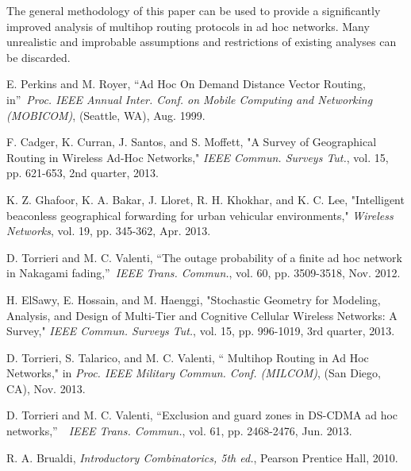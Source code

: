 \documentclass[conference]{IEEEtran}
\begin{document}
The general methodology of this paper can be used
to provide a significantly improved analysis of multihop
routing protocols in ad hoc networks. Many unrealistic
and improbable assumptions and restrictions of existing
analyses can be discarded.

\begin{thebibliography}{9}
E. Perkins and M. Royer, \textquotedblleft Ad Hoc On Demand
Distance Vector Routing, in\textquotedblright\ \textit{Proc. IEEE Annual Inter. Conf. on Mobile Computing and Networking (MOBICOM)}, (Seattle, WA), Aug. 1999.

F. Cadger, K. Curran, J. Santos, and S. Moffett, "A Survey of
Geographical Routing in Wireless Ad-Hoc Networks," \textit{IEEE Commun.
Surveys Tut.}, vol. 15, pp. 621-653, 2nd quarter, 2013.

K. Z. Ghafoor, K. A. Bakar, J. Lloret, R. H. Khokhar, and K. C. Lee, "Intelligent beaconless geographical
forwarding for urban vehicular environments," \textit{Wireless Networks}, vol.
19, pp. 345-362, Apr. 2013.

D. Torrieri and M. C. Valenti, \textquotedblleft The outage
probability of a finite ad hoc network in Nakagami fading,\textquotedblright \ \textit{IEEE Trans. Commun.}, vol. 60, pp. 3509-3518, Nov. 2012.

H. ElSawy, E. Hossain, and M. Haenggi, "Stochastic Geometry for
Modeling, Analysis, and Design of Multi-Tier and Cognitive Cellular Wireless
Networks: A Survey," \textit{IEEE Commun. Surveys Tut.}, vol. 15, pp.
996-1019, 3rd quarter, 2013.

D. Torrieri, S. Talarico, and M. C. Valenti, \textquotedblleft
Multihop Routing in Ad Hoc Networks," in \textit{Proc. IEEE Military Commun.
Conf. (MILCOM)}, (San Diego, CA), Nov. 2013.

D. Torrieri and M. C. Valenti, \textquotedblleft Exclusion and
guard zones in DS-CDMA ad hoc networks,\textquotedblright\ \ \textit{IEEE
Trans. Commun.}, vol. 61, pp. 2468-2476, Jun. 2013.

R. A. Brualdi, \textit{Introductory Combinatorics, 5th ed.},
Pearson Prentice Hall, 2010.
\end{thebibliography}
\end{document}
